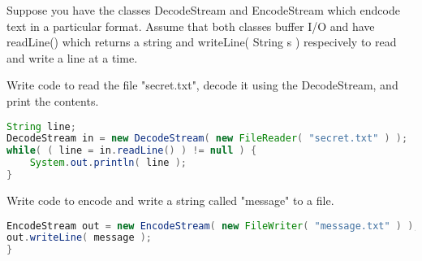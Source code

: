 Suppose you have the classes DecodeStream and EncodeStream which endcode text in a particular format.
Assume that both classes buffer I/O and have readLine() which returns a string and writeLine( String s ) respecively to read and write a line at a time.

Write code to read the file "secret.txt", decode it using the DecodeStream, and print the contents.
\begin{answer}
\begin{lstlisting}[language=java]
String line;
DecodeStream in = new DecodeStream( new FileReader( "secret.txt" ) );
while( ( line = in.readLine() ) != null ) {
	System.out.println( line );
}
\end{lstlisting}
\end{answer}

Write code to encode and write a string called "message" to a file.
\begin{answer}
\begin{lstlisting}[language=java]
EncodeStream out = new EncodeStream( new FileWriter( "message.txt" ) );
out.writeLine( message );
}
\end{lstlisting}
\end{answer}

\vspace{24pt}
